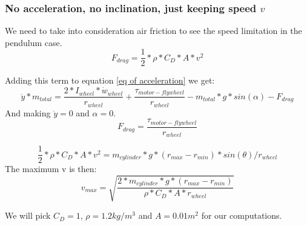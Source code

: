 \subsubsection{No acceleration, no inclination, just keeping speed $v$}
We need to take into consideration air friction to see the speed limitation in the pendulum case.
\[F_{drag} = \frac{1}{2}*\rho*C_D * A * v^2 \]

Adding this term to equation \ref{eq of acceleration} we get:
\[  \ddot{y}*m_{total} = \frac{2*I_{wheel} * \dot{w}_{wheel}}{r_{wheel}} + \frac{\tau_{motor-flywheel}}{r_{wheel}} - m_{total} * g * sin(\alpha) - F_{drag} \]
And making $\ddot{y} = 0$ and $\alpha = 0$.
\[  F_{drag} = \frac{\tau_{motor-flywheel}}{r_{wheel}}\]

\[\frac{1}{2}*\rho*C_D * A * v^2 = m_{cylinder} * g * (r_{max} - r_{min})*sin(\theta) / r_{wheel} \]
The maximum v is then:
\[v_{max} = \sqrt{\frac{2*m_{cylinder} * g * (r_{max} - r_{min})}{\rho*C_D * A * r_{wheel}} } \]

We will pick $C_D=1$, $\rho=1.2 kg/m^3$ and $A=0.01 m^2$ for our computations.
